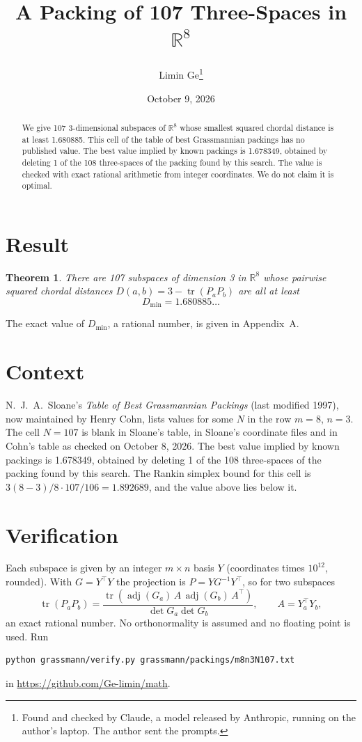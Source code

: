 \documentclass[11pt,a4paper]{article}
\title{A Packing of 107 Three-Spaces in $\mathbb{R}^{8}$}
\author{Limin Ge\thanks{Found and checked by Claude, a model released by Anthropic, running on the author's laptop. The author sent the prompts.}}
\date{October 9, 2026}
\newtheorem*{theorem}{Theorem}
\begin{document}
\maketitle
\begin{abstract}
We give 107 3-dimensional subspaces of $\mathbb{R}^{8}$ whose smallest squared chordal distance is at least 1.680885. This cell of the table of best Grassmannian packings has no published value. The best value implied by known packings is 1.678349, obtained by deleting 1 of the 108 three-spaces of the packing found by this search. The value is checked with exact rational arithmetic from integer coordinates. We do not claim it is optimal.
\end{abstract}

\section{Result}
\begin{theorem}
There are 107 subspaces of dimension 3 in $\mathbb{R}^{8}$ whose pairwise squared chordal distances $D(a,b) = 3 - \operatorname{tr}(P_aP_b)$ are all at least
\[ D_{\min} = 1.680885\ldots \]
\end{theorem}
The exact value of $D_{\min}$, a rational number, is given in Appendix~A.


\section{Context}
N.~J.~A.~Sloane's \emph{Table of Best Grassmannian Packings} (last modified 1997), now maintained by Henry Cohn, lists values for some $N$ in the row $m=8$, $n=3$. The cell $N=107$ is blank in Sloane's table, in Sloane's coordinate files and in Cohn's table as checked on October 8, 2026. The best value implied by known packings is 1.678349, obtained by deleting 1 of the 108 three-spaces of the packing found by this search. The Rankin simplex bound for this cell is $3(8-3)/8\cdot 107/106 = 1.892689$, and the value above lies below it.


\section{Verification}
Each subspace is given by an integer $m\times n$ basis $Y$ (coordinates times $10^{12}$, rounded). With $G=Y^\top Y$ the projection is $P=YG^{-1}Y^\top$, so for two subspaces
\[ \operatorname{tr}(P_aP_b)=\frac{\operatorname{tr}(\operatorname{adj}(G_a)\,A\,\operatorname{adj}(G_b)\,A^\top)}{\det G_a\det G_b},\qquad A=Y_a^\top Y_b, \]
an exact rational number. No orthonormality is assumed and no floating point is used. Run
\begin{verbatim}
python grassmann/verify.py grassmann/packings/m8n3N107.txt
\end{verbatim}
in \url{https://github.com/Ge-limin/math}.
\end{document}
